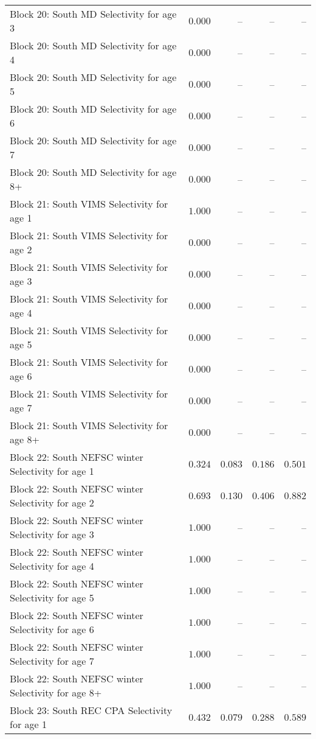 \documentclass[
]{article}
\begin{document}
\begin{landscape}
\begin{longtable}[t]{lrrrr}
Block 20: South MD Selectivity for age 3 & $0.000$ & -- & -- & --\\
Block 20: South MD Selectivity for age 4 & $0.000$ & -- & -- & --\\
Block 20: South MD Selectivity for age 5 & $0.000$ & -- & -- & --\\
Block 20: South MD Selectivity for age 6 & $0.000$ & -- & -- & --\\
\addlinespace
Block 20: South MD Selectivity for age 7 & $0.000$ & -- & -- & --\\
Block 20: South MD Selectivity for age 8+ & $0.000$ & -- & -- & --\\
Block 21: South VIMS Selectivity for age 1 & $1.000$ & -- & -- & --\\
Block 21: South VIMS Selectivity for age 2 & $0.000$ & -- & -- & --\\
Block 21: South VIMS Selectivity for age 3 & $0.000$ & -- & -- & --\\
\addlinespace
Block 21: South VIMS Selectivity for age 4 & $0.000$ & -- & -- & --\\
Block 21: South VIMS Selectivity for age 5 & $0.000$ & -- & -- & --\\
Block 21: South VIMS Selectivity for age 6 & $0.000$ & -- & -- & --\\
Block 21: South VIMS Selectivity for age 7 & $0.000$ & -- & -- & --\\
Block 21: South VIMS Selectivity for age 8+ & $0.000$ & -- & -- & --\\
\addlinespace
Block 22: South NEFSC winter Selectivity for age 1 & $0.324$ & $0.083$ & $0.186$ & $0.501$\\
Block 22: South NEFSC winter Selectivity for age 2 & $0.693$ & $0.130$ & $0.406$ & $0.882$\\
Block 22: South NEFSC winter Selectivity for age 3 & $1.000$ & -- & -- & --\\
Block 22: South NEFSC winter Selectivity for age 4 & $1.000$ & -- & -- & --\\
Block 22: South NEFSC winter Selectivity for age 5 & $1.000$ & -- & -- & --\\
\addlinespace
Block 22: South NEFSC winter Selectivity for age 6 & $1.000$ & -- & -- & --\\
Block 22: South NEFSC winter Selectivity for age 7 & $1.000$ & -- & -- & --\\
Block 22: South NEFSC winter Selectivity for age 8+ & $1.000$ & -- & -- & --\\
Block 23: South REC CPA Selectivity for age 1 & $0.432$ & $0.079$ & $0.288$ & $0.589$\\

\end{longtable}
\end{landscape}
\end{document}

